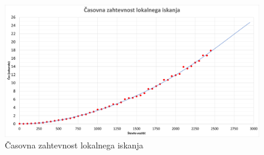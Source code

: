 \documentclass[a4paper, 12 pt]{article}
\theoremstyle{definition}
\theoremstyle{plain}
\theoremstyle{remark}
\begin{document}
\begin{figure}[H]
\centering
  \includegraphics[scale=0.29]{casovna_ zahtevnost_LOKISK.png}
  \caption{Časovna zahtevnost lokalnega iskanja}
  \label{fig:casovna zahtevnost} 
\end{figure}


 

\end{document}
